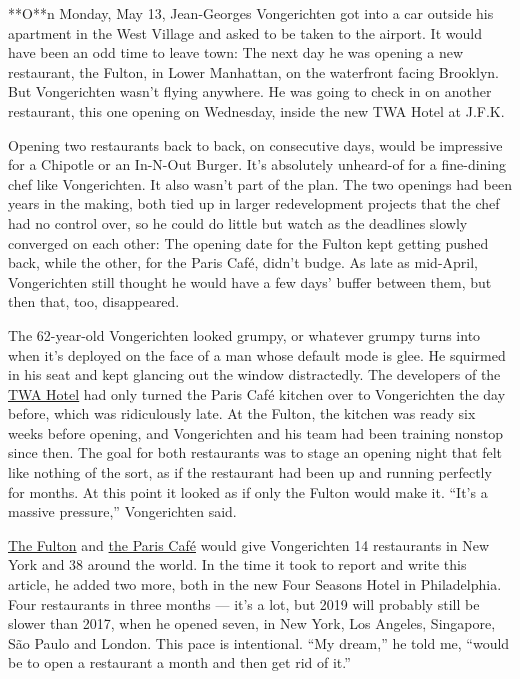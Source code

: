 **O**n Monday, May 13, Jean-Georges Vongerichten got into a car outside
his apartment in the West Village and asked to be taken to the airport.
It would have been an odd time to leave town: The next day he was
opening a new restaurant, the Fulton, in Lower Manhattan, on the
waterfront facing Brooklyn. But Vongerichten wasn't flying anywhere. He
was going to check in on another restaurant, this one opening on
Wednesday, inside the new TWA Hotel at J.F.K.

Opening two restaurants back to back, on consecutive days, would be
impressive for a Chipotle or an In-N-Out Burger. It's absolutely
unheard-of for a fine-dining chef like Vongerichten. It also wasn't part
of the plan. The two openings had been years in the making, both tied up
in larger redevelopment projects that the chef had no control over, so
he could do little but watch as the deadlines slowly converged on each
other: The opening date for the Fulton kept getting pushed back, while
the other, for the Paris Café, didn't budge. As late as mid-April,
Vongerichten still thought he would have a few days' buffer between
them, but then that, too, disappeared.

The 62-year-old Vongerichten looked grumpy, or whatever grumpy turns
into when it's deployed on the face of a man whose default mode is glee.
He squirmed in his seat and kept glancing out the window distractedly.
The developers of the
\href{https://www.nytimes.com/2019/07/01/travel/twa-hotel-jfk.html}{TWA
Hotel} had only turned the Paris Café kitchen over to Vongerichten the
day before, which was ridiculously late. At the Fulton, the kitchen was
ready six weeks before opening, and Vongerichten and his team had been
training nonstop since then. The goal for both restaurants was to stage
an opening night that felt like nothing of the sort, as if the
restaurant had been up and running perfectly for months. At this point
it looked as if only the Fulton would make it. ``It's a massive
pressure,'' Vongerichten said.

\href{https://www.nytimes.com/2019/07/30/dining/the-fulton-review-pete-wells-jean-georges.html}{The
Fulton} and
\href{https://www.nytimes.com/2019/05/15/dining/twa-terminal-restaurants-jean-georges-vongerichten.html}{the
Paris Café} would give Vongerichten 14 restaurants in New York and 38
around the world. In the time it took to report and write this article,
he added two more, both in the new Four Seasons Hotel in Philadelphia.
Four restaurants in three months --- it's a lot, but 2019 will probably
still be slower than 2017, when he opened seven, in New York, Los
Angeles, Singapore, São Paulo and London. This pace is intentional. ``My
dream,'' he told me, ``would be to open a restaurant a month and then
get rid of it.''

